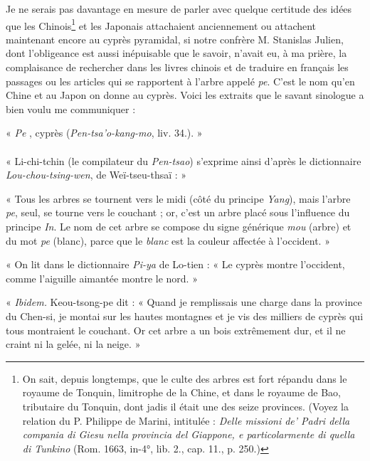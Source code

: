 \documentclass{article}
\begin{document}
Je ne serais pas davantage en mesure de parler avec quelque certitude des idées que les Chinois\footnote{On sait, depuis longtemps, que le culte des arbres est fort répandu dans le royaume de Tonquin, limitrophe de la Chine, et dans le royaume de Bao, tributaire du Tonquin, dont jadis il était une des seize provinces. (Voyez la relation du P. Philippe de Marini, intitulée : \emph{Delle missioni de' Padri della compania di Giesu nella provincia del Giappone, e particolarmente di quella di Tunkino} (Rom. 1663, in-4°, lib. 2., cap. 11., p. 250.)} et les Japonais attachaient anciennement ou attachent maintenant encore au cyprès pyramidal, si notre confrère M. Stanislas Julien, dont l'obligeance est aussi inépuisable que le savoir, n'avait eu, à ma prière, la complaisance de rechercher dans les livres chinois et de traduire en français les passages ou les articles qui se rapportent à l'arbre appelé \emph{pe}. C'est le nom qu'en Chine et au Japon on donne au cyprès. Voici les extraits que le savant sinologue a bien voulu me communiquer :

\begin{center}
« \emph{Pe} , cyprès (\emph{Pen-tsa'o-kang-mo}, liv. 34.). »
\end{center}

\paragraph{}
« Li-chi-tchin (le compilateur du \emph{Pen-tsao}) s'exprime ainsi d'après le dictionnaire \emph{Lou-chou-tsing-wen}, de Weï-tseu-thsaï : »

« Tous les arbres se tournent vers le midi (côté du principe \emph{Yang}), mais l'arbre \emph{pe}, seul, se tourne vers le couchant ; or, c'est un arbre placé sous l'influence du principe \emph{In}. Le nom de cet arbre se compose du signe générique \emph{mou}  (arbre) et du mot \emph{pe}  (blanc), parce que le \emph{blanc} est la couleur affectée à l'occident. »

« On lit dans le dictionnaire \emph{Pi-ya} de Lo-tien : « Le cyprès montre l'occident, comme l'aiguille aimantée montre le nord. »

« \emph{Ibidem.} Keou-tsong-pe dit : « Quand je remplissais une charge dans la province du Chen-si, je montai sur les hautes montagnes et je vis des milliers de cyprès qui tous montraient le couchant. Or cet arbre a un bois extrêmement dur, et il ne craint ni la gelée, ni la neige. »
\end{document}
